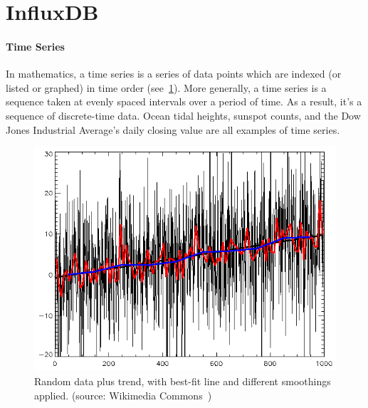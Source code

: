\section{InfluxDB}
\paragraph{Time Series} In mathematics, a time series is a series of data points which are indexed (or listed or graphed) in time order (see~\ref{fig:random time-series}).
More generally, a time series is a sequence taken at evenly spaced intervals over a period of time. As a result, it's a sequence of discrete-time data.
Ocean tidal heights, sunspot counts, and the Dow Jones Industrial Average's daily closing value are all examples of time series.
\begin{figure}[ht]
    \centering
    \includegraphics[width=\linewidth]{content/chapter_3/images/random-data-plus-trend-r2.png}
    \caption{Random data plus trend, with best-fit line and different smoothings applied. (source: Wikimedia Commons~\cite{file:random-data-plus-trend-r2})}
    \label{fig:random time-series}
\end{figure}
